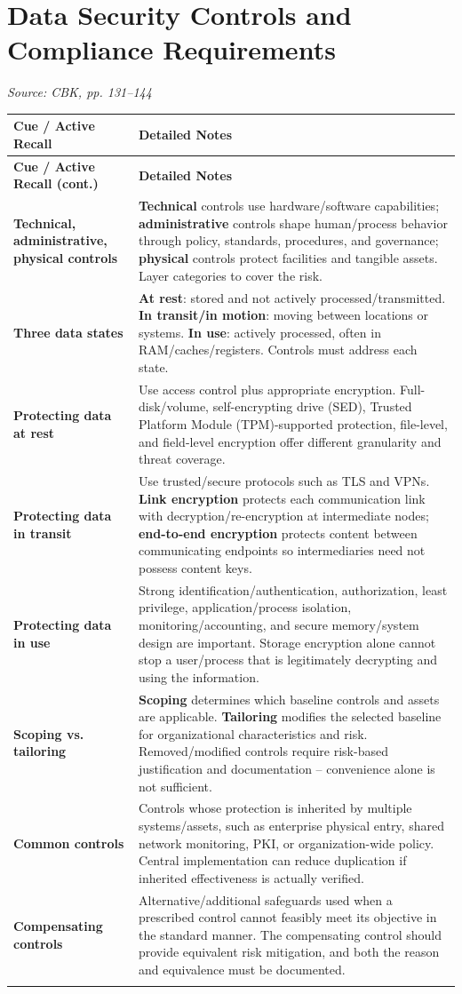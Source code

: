 \documentclass[10pt,letterpaper]{article}
\makeatletter
\newenvironment{cornell}
{\rowcolors{2}{white}{notebg}\begin{longtable}{@{}>{\raggedright\arraybackslash\columncolor{cuebg}\color{navy}\bfseries}p{0.285\textwidth}>{\raggedright\arraybackslash}p{0.65\textwidth}@{}}
\rowcolor{navy}\color{white}\textbf{Cue / Active Recall} & \color{white}\textbf{Detailed Notes}\\ \hline\endfirsthead
\rowcolor{navy}\color{white}\textbf{Cue / Active Recall (cont.)} & \color{white}\textbf{Detailed Notes}\\ \hline\endhead}{\end{longtable}}
\newcommand{\noterow}[2]{#1 & #2\\\arrayrulecolor{line}\hline}
\newcommand{\source}[1]{\par{\footnotesize\color{teal}\textit{Source: CBK, #1}}\par}
\makeatother
\begin{document}
\section{\color{navy}Data Security Controls and Compliance Requirements}
\source{pp. 131--144}
\begin{cornell}
\noterow{Technical, administrative, physical controls}{\textbf{Technical} controls use hardware/software capabilities; \textbf{administrative} controls shape human/process behavior through policy, standards, procedures, and governance; \textbf{physical} controls protect facilities and tangible assets. Layer categories to cover the risk.}
\noterow{Three data states}{\textbf{At rest}: stored and not actively processed/transmitted. \textbf{In transit/in motion}: moving between locations or systems. \textbf{In use}: actively processed, often in RAM/caches/registers. Controls must address each state.}
\noterow{Protecting data at rest}{Use access control plus appropriate encryption. Full-disk/volume, self-encrypting drive (SED), Trusted Platform Module (TPM)-supported protection, file-level, and field-level encryption offer different granularity and threat coverage.}
\noterow{Protecting data in transit}{Use trusted/secure protocols such as TLS and VPNs. \textbf{Link encryption} protects each communication link with decryption/re-encryption at intermediate nodes; \textbf{end-to-end encryption} protects content between communicating endpoints so intermediaries need not possess content keys.}
\noterow{Protecting data in use}{Strong identification/authentication, authorization, least privilege, application/process isolation, monitoring/accounting, and secure memory/system design are important. Storage encryption alone cannot stop a user/process that is legitimately decrypting and using the information.}
\noterow{Scoping vs. tailoring}{\textbf{Scoping} determines which baseline controls and assets are applicable. \textbf{Tailoring} modifies the selected baseline for organizational characteristics and risk. Removed/modified controls require risk-based justification and documentation -- convenience alone is not sufficient.}
\noterow{Common controls}{Controls whose protection is inherited by multiple systems/assets, such as enterprise physical entry, shared network monitoring, PKI, or organization-wide policy. Central implementation can reduce duplication if inherited effectiveness is actually verified.}
\noterow{Compensating controls}{Alternative/additional safeguards used when a prescribed control cannot feasibly meet its objective in the standard manner. The compensating control should provide equivalent risk mitigation, and both the reason and equivalence must be documented.}

\end{cornell}
\end{document}
